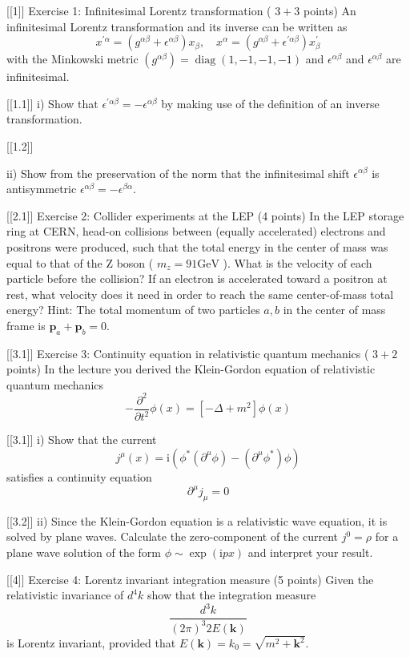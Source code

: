 
[[1]]
Exercise 1: Infinitesimal Lorentz transformation ( $3+3$ points)
An infinitesimal Lorentz transformation and its inverse can be written as
$$
x^{\prime \alpha}=\left(g^{\alpha \beta}+\epsilon^{\alpha \beta}\right) x_\beta, \quad x^\alpha=\left(g^{\alpha \beta}+\epsilon^{\prime \alpha \beta}\right) x_\beta^{\prime}
$$
with the Minkowski metric $\left(g^{\alpha \beta}\right)=\operatorname{diag}(1,-1,-1,-1)$ and $\epsilon^{\alpha \beta}$ and $\epsilon^{\alpha \beta}$ are infinitesimal.

[[1.1]]
i) Show that $\epsilon^{\prime \alpha \beta}=-\epsilon^{\alpha \beta}$ by making use of the definition of an inverse transformation.

[[1.2]]

ii) Show from the preservation of the norm that the infinitesimal shift $\epsilon^{\alpha \beta}$ is antisymmetric $\epsilon^{\alpha \beta}=-\epsilon^{\beta \alpha}$.


[[2.1]]
Exercise 2: Collider experiments at the LEP (4 points)
In the LEP storage ring at CERN, head-on collisions between (equally accelerated) electrons and positrons were produced, such that the total energy in the center of mass was equal to that of the Z boson ( $m_z=91 \mathrm{GeV}$ ). What is the velocity of each particle before the collision? If an electron is accelerated toward a positron at rest, what velocity does it need in order to reach the same center-of-mass total energy?
Hint: The total momentum of two particles $a, b$ in the center of mass frame is $\mathbf{p}_a+\mathbf{p}_b=0$.

[[3.1]]
Exercise 3: Continuity equation in relativistic quantum mechanics ( $3+2$ points) In the lecture you derived the Klein-Gordon equation of relativistic quantum mechanics
$$
-\frac{\partial^2}{\partial t^2} \phi(x)=\left[-\Delta+m^2\right] \phi(x)
$$

[[3.1]]
i) Show that the current
$$
j^\mu(x)=\mathrm{i}\left(\phi^*\left(\partial^\mu \phi\right)-\left(\partial^\mu \phi^*\right) \phi\right)
$$
satisfies a continuity equation
$$
\partial^\mu j_\mu=0
$$

[[3.2]]
ii) Since the Klein-Gordon equation is a relativistic wave equation, it is solved by plane waves. Calculate the zero-component of the current $j^0=\rho$ for a plane wave solution of the form $\phi \sim \exp (\mathrm{i} p x)$ and interpret your result.


[[4]]
Exercise 4: Lorentz invariant integration measure (5 points)
Given the relativistic invariance of $d^4 k$ show that the integration measure
$$
\frac{d^3 k}{(2 \pi)^3 2 E(\mathbf{k})}
$$
is Lorentz invariant, provided that $E(\mathbf{k})=k_0=\sqrt{m^2+\mathbf{k}^2}$. 

